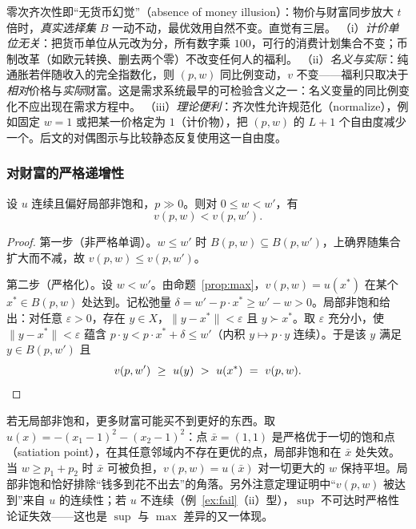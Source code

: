 零次齐次性即“无货币幻觉”（absence of money illusion）：物价与财富同步放大 $t$ 倍时，\emph{真实选择集} $B$ 一动不动，最优效用自然不变。直觉有三层。
（i）\emph{计价单位无关}：把货币单位从元改为分，所有数字乘 $100$，可行的消费计划集合不变；币制改革（如欧元转换、删去两个零）不改变任何人的福利。
（ii）\emph{名义与实际}：纯通胀若伴随收入的完全指数化，则 $(p,w)$ 同比例变动，$v$ 不变——福利只取决于\emph{相对}价格与\emph{实际}财富。这是需求系统最早的可检验含义之一：名义变量的同比例变化不应出现在需求方程中。
（iii）\emph{理论便利}：齐次性允许规范化（normalize），例如固定 $w=1$ 或把某一价格定为 $1$（计价物），把 $(p,w)$ 的 $L+1$ 个自由度减少一个。后文的对偶图示与比较静态反复使用这一自由度。

\subsubsection{对财富的严格递增性}

\begin{theorem}[对 $w$ 严格递增]
\label{thm:incw}
设 $u$ 连续且偏好局部非饱和，$p\gg0$。则对 $0\le w<w'$，有
\[
v(p,w)<v(p,w').
\]
\end{theorem}
\begin{proof}
第一步（非严格单调）。$w\le w'$ 时 $B(p,w)\subseteq B(p,w')$，上确界随集合扩大而不减，故 $v(p,w)\le v(p,w')$。

第二步（严格化）。设 $w<w'$。由命题~\ref{prop:max}，$v(p,w)=u(x^*)$ 在某个 $x^*\in B(p,w)$ 处达到。记松弛量 $\delta=w'-p\cdot x^*\ge w'-w>0$。局部非饱和给出：对任意 $\varepsilon>0$，存在 $y\in X$，$\|y-x^*\|<\varepsilon$ 且 $y\succ x^*$。取 $\varepsilon$ 充分小，使 $\|y-x^*\|<\varepsilon$ 蕴含 $p\cdot y<p\cdot x^*+\delta\le w'$（内积 $y\mapsto p\cdot y$ 连续）。于是该 $y$ 满足 $y\in B(p,w')$ 且
\[
v(p,w')\ \ge\ u(y)\ >\ u(x^*)\ =\ v(p,w).\qedhere
\]
\end{proof}

\begin{remark}[局部非饱和不可省]
若无局部非饱和，更多财富可能买不到更好的东西。取 $u(x)=-(x_1-1)^2-(x_2-1)^2$：点 $\bar x=(1,1)$ 是严格优于一切的饱和点（satiation point），在其任意邻域内不存在更优的点，局部非饱和在 $\bar x$ 处失效。当 $w\ge p_1+p_2$ 时 $\bar x$ 可被负担，$v(p,w)=u(\bar x)$ 对一切更大的 $w$ 保持平坦。局部非饱和恰好排除“钱多到花不出去”的角落。另外注意定理证明中“$v(p,w)$ 被达到”来自 $u$ 的连续性；若 $u$ 不连续（例~\ref{ex:fail}（ii）型），$\sup$ 不可达时严格性论证失效——这也是 $\sup$ 与 $\max$ 差异的又一体现。
\end{remark}

